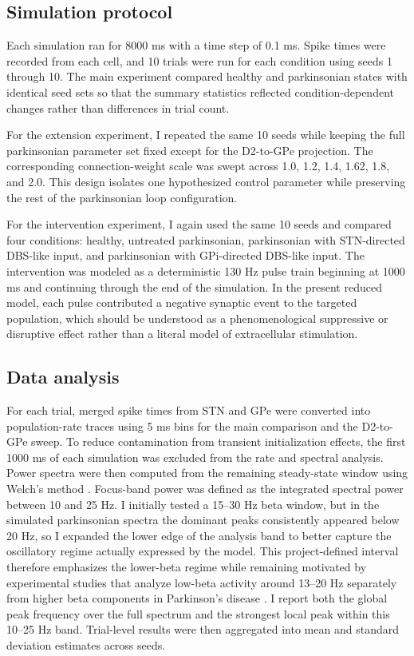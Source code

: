\documentclass[11pt]{article}
\begin{document}
\subsection{Simulation protocol}
Each simulation ran for 8000 ms with a time step of 0.1 ms. Spike times were recorded from each cell, and 10 trials were run for each condition using seeds 1 through 10. The main experiment compared healthy and parkinsonian states with identical seed sets so that the summary statistics reflected condition-dependent changes rather than differences in trial count.

For the extension experiment, I repeated the same 10 seeds while keeping the full parkinsonian parameter set fixed except for the D2-to-GPe projection. The corresponding connection-weight scale was swept across 1.0, 1.2, 1.4, 1.62, 1.8, and 2.0. This design isolates one hypothesized control parameter while preserving the rest of the parkinsonian loop configuration.

For the intervention experiment, I again used the same 10 seeds and compared four conditions: healthy, untreated parkinsonian, parkinsonian with STN-directed DBS-like input, and parkinsonian with GPi-directed DBS-like input. The intervention was modeled as a deterministic 130 Hz pulse train beginning at 1000 ms and continuing through the end of the simulation. In the present reduced model, each pulse contributed a negative synaptic event to the targeted population, which should be understood as a phenomenological suppressive or disruptive effect rather than a literal model of extracellular stimulation.

\subsection{Data analysis}
For each trial, merged spike times from STN and GPe were converted into population-rate traces using 5 ms bins for the main comparison and the D2-to-GPe sweep. To reduce contamination from transient initialization effects, the first 1000 ms of each simulation was excluded from the rate and spectral analysis. Power spectra were then computed from the remaining steady-state window using Welch's method \citep{Welch1967}. Focus-band power was defined as the integrated spectral power between 10 and 25 Hz. I initially tested a 15--30 Hz beta window, but in the simulated parkinsonian spectra the dominant peaks consistently appeared below 20 Hz, so I expanded the lower edge of the analysis band to better capture the oscillatory regime actually expressed by the model. This project-defined interval therefore emphasizes the lower-beta regime while remaining motivated by experimental studies that analyze low-beta activity around 13--20 Hz separately from higher beta components in Parkinson's disease \citep{JenkinsonBrown2011,Levy2002,Mathiopoulou2024}. I report both the global peak frequency over the full spectrum and the strongest local peak within this 10--25 Hz band. Trial-level results were then aggregated into mean and standard deviation estimates across seeds.
\end{document}
